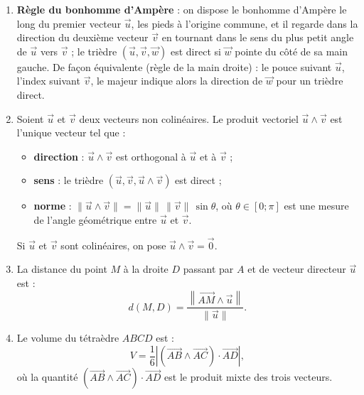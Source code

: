 \documentclass[11pt]{article}
\newcommand{\cle}[1]{{\popxbold\color{popdark}#1}}
\begin{document}
\begin{corrige}
\begin{enumerate}
\item \textbf{Règle du bonhomme d'Ampère} : on dispose le bonhomme d'Ampère le long du premier vecteur $\vec{u}$, les pieds à l'origine commune, et il regarde dans la direction du deuxième vecteur $\vec{v}$ en tournant dans le sens du plus petit angle de $\vec{u}$ vers $\vec{v}$ ; le trièdre $(\vec{u}, \vec{v}, \vec{w})$ est direct si $\vec{w}$ pointe du côté de sa main gauche. De façon équivalente (règle de la main droite) : le pouce suivant $\vec{u}$, l'index suivant $\vec{v}$, le majeur indique alors la direction de $\vec{w}$ pour un trièdre direct.
\item Soient $\vec{u}$ et $\vec{v}$ deux vecteurs non colinéaires. Le produit vectoriel $\vec{u} \wedge \vec{v}$ est l'unique vecteur tel que :
\begin{itemize}
\item \textbf{direction} : $\vec{u} \wedge \vec{v}$ est orthogonal à $\vec{u}$ et à $\vec{v}$ ;
\item \textbf{sens} : le trièdre $(\vec{u}, \vec{v}, \vec{u} \wedge \vec{v})$ est direct ;
\item \textbf{norme} : $\|\vec{u} \wedge \vec{v}\| = \|\vec{u}\|\,\|\vec{v}\|\,\sin\theta$, où $\theta \in [0 ; \pi]$ est une mesure de l'angle géométrique entre $\vec{u}$ et $\vec{v}$.
\end{itemize}
Si $\vec{u}$ et $\vec{v}$ sont colinéaires, on pose $\vec{u} \wedge \vec{v} = \vec{0}$.
\item La distance du point $M$ à la droite $D$ passant par $A$ et de vecteur directeur $\vec{u}$ est :
\[ d(M, D) = \dfrac{\left\|\overrightarrow{AM} \wedge \vec{u}\right\|}{\|\vec{u}\|}. \]
\item Le volume du tétraèdre $ABCD$ est :
\[ V = \dfrac{1}{6}\left|\left(\overrightarrow{AB} \wedge \overrightarrow{AC}\right) \cdot \overrightarrow{AD}\right|, \]
où la quantité $\left(\overrightarrow{AB} \wedge \overrightarrow{AC}\right) \cdot \overrightarrow{AD}$ est le \cle{produit mixte} des trois vecteurs.
\end{enumerate}
\end{corrige}
\end{document}
